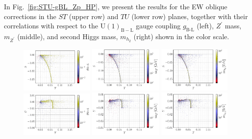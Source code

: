 \documentclass[10pt]{report}
\newcommand{\ro}[1]{\textrm{#1}}
\newcommand{\U}[1]{\mathrm{U}(1)_{\mathrm{#1}}}
\begin{document}
In Fig.~\ref{fig:STU-gBL_Zp_HP}, we present the results for the EW oblique corrections in the $ST$ (upper row) and $TU$ (lower row) planes, together with their correlations with respect to the $\U{B-L}$ gauge coupling $g_{\ro{B-L}}$ (left), $Z^\prime$ mass, $m_{Z^\prime}$ (middle), and second Higgs mass, $m_{h_2}$ (right) shown in the color scale.


\begin{figure}[!htb]
\centering
\includegraphics[width=0.32\textwidth]{Images/BLSM_2/TS_gBL.pdf}
\includegraphics[width=0.32\textwidth]{Images/BLSM_2/TS_Zp.pdf}
\includegraphics[width=0.32\textwidth]{Images/BLSM_2/TS_HP.pdf}
\includegraphics[width=0.32\textwidth]{Images/BLSM_2/TU_gBL.pdf}
\includegraphics[width=0.32\textwidth]{Images/BLSM_2/TU_Zp.pdf}
\includegraphics[width=0.32\textwidth]{Images/BLSM_2/TU_HP.pdf}

\end{figure}
\end{document}
